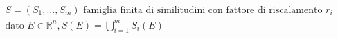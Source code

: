 \documentclass[preview]{standalone}
\begin{document}
\begin{align*}
S = (S_1, ..., S_m) \text{ famiglia finita di similitudini con fattore di riscalamento } r_i \\ \text{dato } E \in \mathbb{R}^n, S(E) = \bigcup_{i=1}^m S_i(E)
\end{align*}
\end{document}

